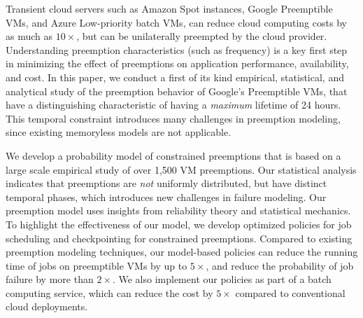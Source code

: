 Transient cloud servers such as Amazon Spot instances, Google Preemptible VMs, and Azure Low-priority batch VMs, can reduce cloud computing costs by as much as $10\times$, but can be unilaterally preempted by the cloud provider.
Understanding preemption characteristics (such as frequency) is a key first step in minimizing the effect of preemptions on application performance, availability, and cost. 
In this paper, we conduct a first of its kind empirical, statistical, and analytical study of the preemption behavior of Google's Preemptible VMs, 
that have a distinguishing characteristic of having a \emph{maximum} lifetime of 24 hours. 
This temporal constraint introduces many challenges in preemption modeling, since existing memoryless models are not applicable. 

We develop a probability model of constrained preemptions that is based on a large scale empirical study of over 1,500 VM preemptions. 
Our statistical analysis indicates that preemptions are \emph{not} uniformly distributed, but have distinct temporal phases, which introduces new challenges in failure modeling.  
Our preemption model uses insights from reliability theory and  statistical mechanics. 
To highlight the effectiveness of our model, we develop optimized policies for job scheduling and checkpointing for constrained preemptions. 
Compared to existing preemption modeling techniques, our model-based policies can reduce the running time of jobs on preemptible VMs by up to $5\times$, and reduce the probability of job failure by more than $2\times$. 
We also implement our policies as part of a batch computing service, which can reduce the cost by $5\times$ compared to conventional cloud deployments.










